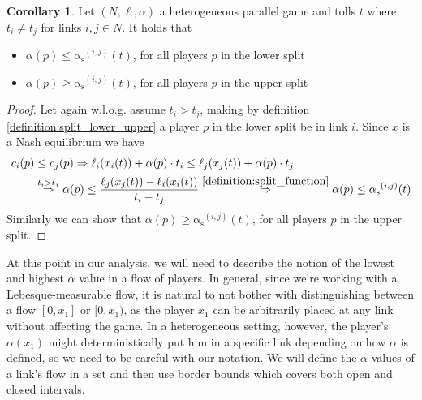 \documentclass[10pt,a4paper]{book}
\newcommand{\RightarrowArg}[1]{\stackrel{#1}{\Rightarrow}}
\newcommand{\as}{\mathrm{\alpha_s}}
\theoremstyle{definition}
\newtheorem{corollary}[definition]{Corollary}
\theoremstyle{comment}
\begin{document}
\begin{corollary}
	\label{corollary:split_to_alpha}
	Let $(N, \ell, \alpha)$ a heterogeneous parallel game and tolls $t$ where $t_i \ne t_j$ for links $i, j \in N$.
	It holds that
	\begin{itemize}
		\item $\alpha(p) \le \as^{(i, j)}(t)$, for all players $p$ in the lower split
		\item $\alpha(p) \ge \as^{(i, j)}(t)$, for all players $p$ in the upper split
	\end{itemize}
\end{corollary}

\begin{proof}
	Let again w.l.o.g. assume $t_i > t_j$, making by definition \ref{definition:split_lower_upper} a player $p$ in the lower split be in link $i$.
	Since $x$ is a Nash equilibrium we have
	\begin{align*}
		c_i(p) &\le c_j(p) \Rightarrow \ell_i(x_i(t)) + \alpha(p) \cdot t_i \le \ell_j(x_j(t)) + \alpha(p) \cdot t_j \\
		&\RightarrowArg{t_i > t_j} \alpha(p) \le \frac{\ell_j(x_j(t)) - \ell_i(x_i(t))}{t_i - t_j} \RightarrowArg{\ref{definition:split_function}} \alpha(p) \le \as^{(i, j)}(t)
	\end{align*}
	Similarly we can show that $\alpha(p) \ge \as^{(i, j)}(t)$, for all players $p$ in the upper split.
\end{proof}

At this point in our analysis, we will need to describe the notion of the lowest and highest $\alpha$ value in a flow of players.
In general, since we're working with a Lebesque-measurable flow, it is natural to not bother with distinguishing between a flow $[0, x_1]$ or $[0, x_1)$, as the player $x_1$ can be arbitrarily placed at any link without affecting the game.
In a heterogeneous setting, however, the player's $\alpha(x_1)$ might deterministically put him in a specific link depending on how $\alpha$ is defined, so we need to be careful with our notation.
We will define the $\alpha$ values of a link's flow in a set and then use border bounds which covers both open and closed intervals.
\end{document}
